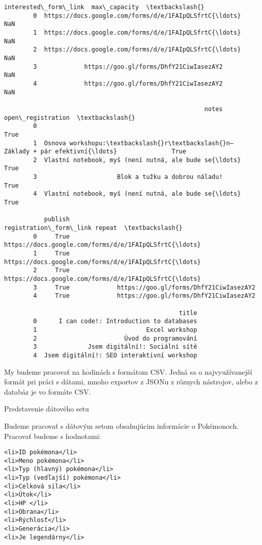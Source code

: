 \documentclass[11pt]{article}
\begin{document}
\begin{Verbatim}[commandchars=\\\{\}]
                                        interested\_form\_link  max\_capacity  \textbackslash{}
        0  https://docs.google.com/forms/d/e/1FAIpQLSfrtC{\ldots}           NaN   
        1  https://docs.google.com/forms/d/e/1FAIpQLSfrtC{\ldots}           NaN   
        2  https://docs.google.com/forms/d/e/1FAIpQLSfrtC{\ldots}           NaN   
        3             https://goo.gl/forms/DhfY21CiwIasezAY2           NaN   
        4             https://goo.gl/forms/DhfY21CiwIasezAY2           NaN   
        
                                                       notes  open\_registration  \textbackslash{}
        0                                                                  True   
        1  Osnova workshopu:\textbackslash{}r\textbackslash{}n– Základy + pár efektivní{\ldots}               True   
        2  Vlastní notebook, myš (není nutná, ale bude se{\ldots}               True   
        3                      Blok a tužku a dobrou náladu!               True   
        4  Vlastní notebook, myš (není nutná, ale bude se{\ldots}               True   
        
           publish                             registration\_form\_link repeat  \textbackslash{}
        0     True  https://docs.google.com/forms/d/e/1FAIpQLSfrtC{\ldots}          
        1     True  https://docs.google.com/forms/d/e/1FAIpQLSfrtC{\ldots}          
        2     True  https://docs.google.com/forms/d/e/1FAIpQLSfrtC{\ldots}          
        3     True             https://goo.gl/forms/DhfY21CiwIasezAY2          
        4     True             https://goo.gl/forms/DhfY21CiwIasezAY2          
        
                                                title  
        0      I can code!: Introduction to databases  
        1                              Excel workshop  
        2                        Úvod do programování  
        3              Jsem digitální!: Sociální sítě  
        4  Jsem digitální!: SEO interaktivní workshop  
\end{Verbatim}
            
    My budeme pracovať na hodinách s formátom CSV. Jedná sa o
najvyužívanejší formát pri práci s dátami, mnoho exportov z JSONu z
rôznych nástrojov, alebo z databáz je vo formáte CSV.

Predstavenie dátového setu

Budeme pracovať s dátovým setom obsahujúcim informácie o Pokémonoch.
Pracovať budeme s hodnotami:

\begin{verbatim}
<li>ID pokémona</li>
<li>Meno pokémona</li>
<li>Typ (hlavný) pokémona</li>
<li>Typ (vedľajší) pokémona</li>
<li>Celková sila</li>
<li>Útok</li>
<li>HP </li>
<li>Obrana</li>
<li>Rýchlosť</li>
<li>Generácia</li>
<li>Je legendárny</li>
\end{verbatim}
\end{document}
